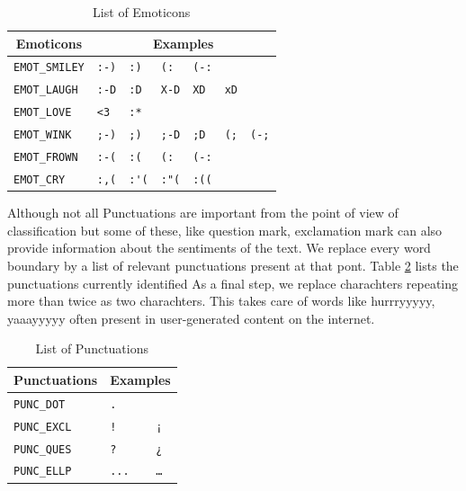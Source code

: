 \begin{table}[h]
\centering
	\begin{tabular}{|l|llllll|}
	
	\hline
		\multicolumn{1}{|c|}{Emoticons} &
		\multicolumn{6}{|c|}{Examples} \\
	\hline
	\verb+EMOT_SMILEY+ 	& \verb+:-)+ 	& \verb+:)+ 	& \verb+(:+ 	& \verb+(-:+ 	& \verb++ 	& \verb++ \\
	\verb+EMOT_LAUGH+ 	& \verb+:-D+ 	& \verb+:D+ 	& \verb+X-D+ 	& \verb+XD+ 	& \verb+xD+ 	& \verb++ \\
	\verb+EMOT_LOVE+ 	& \verb+<3+ 	& \verb+:*+ 	& \verb++ 	& \verb++ 	& \verb++ 	& \verb++ \\
	\verb+EMOT_WINK+ 	& \verb+;-)+ 	& \verb+;)+ 	& \verb+;-D+ 	& \verb+;D+ 	& \verb+(;+ 	& \verb+(-;+ \\
	\verb+EMOT_FROWN+ 	& \verb+:-(+ 	& \verb+:(+ 	& \verb+(:+ 	& \verb+(-:+ 	& \verb++ 	& \verb++ \\
	\verb+EMOT_CRY+ 	& \verb+:,(+ 	& \verb+:'(+ 	& \verb+:"(+ 	& \verb+:((+ 	& \verb++ 	& \verb++ \\
	\hline
	
	\end{tabular}
\caption{List of Emoticons}
\label{table:emot}
\end{table}

Although not all Punctuations are important from the point of view of classification but some of these,
	like question mark, exclamation mark can also provide information about the sentiments of the text.
We replace every word boundary by a list of relevant punctuations present at that pont.
Table \ref{table:punc} lists the punctuations currently identified
As a final step, we replace charachters repeating more than twice as two charachters.
This takes care of words like hurrryyyyy, yaaayyyyy often present in user-generated content on the internet.

\begin{table}[h]
\centering
	\begin{tabular}{|l|ll|}
	
	\hline
		\multicolumn{1}{|c|}{Punctuations} &
		\multicolumn{2}{|c|}{Examples} \\
	\hline
	\verb+PUNC_DOT+ & \verb+.+ & \verb++ \\
	\verb+PUNC_EXCL+ & \verb+!+ & \verb+¡+ \\
	\verb+PUNC_QUES+ & \verb+?+ & \verb+¿+ \\
	\verb+PUNC_ELLP+ & \verb+...+ & \verb+…+ \\
	\hline

	\end{tabular}
\caption{List of Punctuations}
\label{table:punc}
\end{table}

